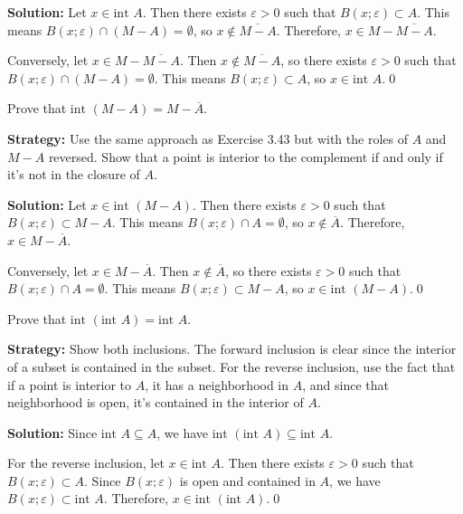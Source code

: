 \bigskip\noindent\textbf{Solution:} Let $x \in \text{int } A$. Then there exists $\varepsilon > 0$ such that $B(x;\varepsilon) \subset A$. This means $B(x;\varepsilon) \cap (M - A) = \emptyset$, so $x \notin \overline{M - A}$. Therefore, $x \in M - \overline{M - A}$.

Conversely, let $x \in M - \overline{M - A}$. Then $x \notin \overline{M - A}$, so there exists $\varepsilon > 0$ such that $B(x;\varepsilon) \cap (M - A) = \emptyset$. This means $B(x;\varepsilon) \subset A$, so $x \in \text{int } A$.\qed


\begin{problembox}
Prove that \(\text{int }(M - A) = M - \overline{A}\).
\end{problembox}

\noindent\textbf{Strategy:} Use the same approach as Exercise 3.43 but with the roles of $A$ and $M-A$ reversed. Show that a point is interior to the complement if and only if it's not in the closure of $A$.

\bigskip\noindent\textbf{Solution:} Let $x \in \text{int }(M - A)$. Then there exists $\varepsilon > 0$ such that $B(x;\varepsilon) \subset M - A$. This means $B(x;\varepsilon) \cap A = \emptyset$, so $x \notin \overline{A}$. Therefore, $x \in M - \overline{A}$.

Conversely, let $x \in M - \overline{A}$. Then $x \notin \overline{A}$, so there exists $\varepsilon > 0$ such that $B(x;\varepsilon) \cap A = \emptyset$. This means $B(x;\varepsilon) \subset M - A$, so $x \in \text{int }(M - A)$.\qed


\begin{problembox}
Prove that \(\text{int }(\text{int } A) = \text{int } A\).
\end{problembox}

\noindent\textbf{Strategy:} Show both inclusions. The forward inclusion is clear since the interior of a subset is contained in the subset. For the reverse inclusion, use the fact that if a point is interior to $A$, it has a neighborhood in $A$, and since that neighborhood is open, it's contained in the interior of $A$.

\bigskip\noindent\textbf{Solution:} Since $\text{int } A \subseteq A$, we have $\text{int }(\text{int } A) \subseteq \text{int } A$.

For the reverse inclusion, let $x \in \text{int } A$. Then there exists $\varepsilon > 0$ such that $B(x;\varepsilon) \subset A$. Since $B(x;\varepsilon)$ is open and contained in $A$, we have $B(x;\varepsilon) \subset \text{int } A$. Therefore, $x \in \text{int }(\text{int } A)$.\qed


